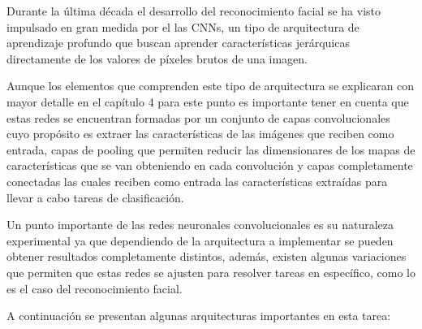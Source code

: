 Durante la última década el desarrollo del reconocimiento facial se ha visto impulsado en gran medida por el las CNNs, un tipo de arquitectura de aprendizaje profundo que buscan aprender características jerárquicas directamente de los valores de píxeles brutos de una imagen.

Aunque los elementos que comprenden este tipo de arquitectura se explicaran con mayor detalle en el capítulo 4 para este punto es importante tener en cuenta que estas redes se encuentran formadas por un conjunto de capas convolucionales cuyo propósito es extraer las características de las imágenes que reciben como entrada, capas de pooling que permiten reducir las dimensionares de los mapas de características que se van obteniendo en cada convolución y capas completamente conectadas las cuales reciben como entrada las características extraídas para llevar a cabo tareas de clasificación.

Un punto importante de las redes neuronales convolucionales es su naturaleza experimental ya que dependiendo de la arquitectura a implementar se pueden obtener resultados completamente distintos, además, existen algunas variaciones que permiten que estas redes se ajusten para resolver tareas en específico, como lo es el caso del reconocimiento facial.

A continuación se presentan algunas arquitecturas importantes en esta tarea:

